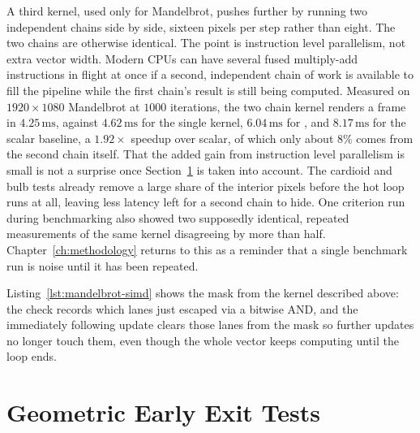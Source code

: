 \documentclass{ftndiplomski}
\begin{document}
A third kernel, used only for Mandelbrot, pushes further by running two independent 
chains side by side, sixteen pixels per step rather than eight. The two chains are otherwise
identical. The point is instruction level parallelism, not extra vector width. Modern CPUs can have
several fused multiply-add instructions in flight at once if a second, independent chain of work is
available to fill the pipeline while the first chain's result is still being computed. Measured on
$1920\times1080$ Mandelbrot at $1000$ iterations, the two chain kernel renders a frame in
$4.25\,\mathrm{ms}$, against $4.62\,\mathrm{ms}$ for the single  kernel,
$6.04\,\mathrm{ms}$ for , and $8.17\,\mathrm{ms}$ for the scalar baseline, a $1.92\times$
speedup over scalar, of which only about $8\%$ comes from the second chain itself. That the added
gain from instruction level parallelism is small is not a surprise once Section~\ref{sec:early-exit}
is taken into account. The cardioid and bulb tests already remove a large share of the interior
pixels before the hot loop runs at all, leaving less latency left for a second chain to hide. One
criterion run during benchmarking also showed two supposedly identical, repeated measurements of
the same kernel disagreeing by more than half. Chapter~\ref{ch:methodology} returns to this as a
reminder that a single benchmark run is noise until it has been repeated.

Listing~\ref{lst:mandelbrot-simd} shows the  mask from the  kernel
described above: the  check records which lanes just escaped via a bitwise
AND, and the immediately following  update clears those lanes from the mask so
further updates no longer touch them, even though the whole vector keeps computing until the loop
ends.

\noindent\begin{minipage}{\linewidth}

\end{minipage}

\section{Geometric Early Exit Tests}
\label{sec:early-exit}
\end{document}
